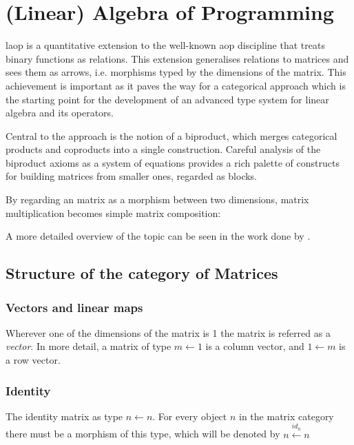 \documentclass[
  oneside,
  11pt, a4paper,
  footinclude=true,
  headinclude=true,
  cleardoublepage=empty
]{scrbook}
\theoremstyle{definition}
\theoremstyle{definition}
\begin{document}
    \section{(Linear) Algebra of Programming}
    
    \gls{laop} is a quantitative extension to the well-known \gls{aop} discipline that treats binary functions as relations. This extension generalises relations to matrices and sees them as arrows, i.e. morphisms typed by the dimensions of the matrix. This achievement is important as it paves the way for a categorical approach which is the starting point for the development of an advanced type system for linear algebra and its operators.
    
    Central to the approach is the notion of a biproduct, which merges categorical products and coproducts into a single construction. Careful analysis of the biproduct axioms as a system of equations provides a rich palette of constructs for building matrices from smaller ones, regarded as blocks.
    
    By regarding an matrix as a morphism between two dimensions, matrix multiplication becomes simple matrix composition:
    
    \begin{center}
    \end{center}
    
    A more detailed overview of the topic can be seen in the work done by \cite{Macedo2012MatricesAA}. 
    
        \subsection{Structure of the category of Matrices}
        
            \subsubsection{Vectors and linear maps} Wherever one of the dimensions of the matrix is 1 the matrix is referred as a \emph{vector}. In more detail, a matrix of type $m \leftarrow 1$ is a column vector, and $1 \leftarrow m$ is a row vector.
            
            \subsubsection{Identity} The identity matrix as type $n \leftarrow n$. For every object $n$ in the matrix category there must be a morphism of this type, which will be denoted by $n \xleftarrow{id_n} n$
            
\end{document}
